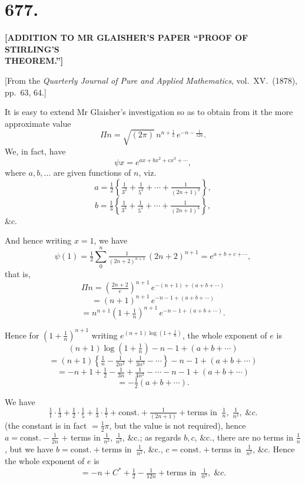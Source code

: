 \documentclass[11pt,a4paper]{article}
\begin{document}
\section*{677.}

\begin{center}
\textbf{[ADDITION TO MR GLAISHER'S PAPER ``PROOF OF STIRLING'S\\
THEOREM.'']}
\end{center}

\medskip

\begin{center}
[From the \emph{Quarterly Journal of Pure and Applied Mathematics}, vol.~XV.\ (1878), pp.~63, 64.]
\end{center}

\medskip

\noindent It is easy to extend Mr Glaisher's investigation so as to obtain from it the more approximate value
\[
\Pi n = \sqrt{(2\pi)}\,n^{n + \frac{1}{2}}\,e^{-n - \frac{1}{12n}}.
\]
We, in fact, have
\[
\psi x = e^{ax + bx^{2} + cx^{3} + \cdots},
\]
where $a, b, \ldots$ are given functions of $n$, viz.
\[
a = \tfrac{1}{2}\left\{\tfrac{1}{3^{2}} + \tfrac{1}{5^{2}} + \cdots + \tfrac{1}{(2n + 1)^{2}}\right\},
\]
\[
b = \tfrac{1}{3}\left\{\tfrac{1}{3^{3}} + \tfrac{1}{5^{3}} + \cdots + \tfrac{1}{(2n + 1)^{3}}\right\},
\]
\&c.

And hence writing $x = 1$, we have
\[
\psi(1) = \tfrac{1}{2}\sum_{0}^{n} \tfrac{1}{(2n + 2)^{n + 1}}\,(2n + 2)^{n + 1} = e^{a + b + c + \cdots},
\]
that is,
\[
\Pi n = \left(\tfrac{2n + 2}{e}\right)^{n + 1}\,e^{-(n + 1) + (a + b + \cdots)}
\]
\[
= (n + 1)^{n + 1}\,e^{-n - 1 + (a + b + \cdots)}
\]
\[
= n^{n + 1}\left(1 + \tfrac{1}{n}\right)^{n + 1}\,e^{-n - 1 + (a + b + \cdots)}.
\]

\newpage


\noindent Hence for $\left(1 + \tfrac{1}{n}\right)^{n + 1}$ writing $e^{(n + 1)\log\left(1 + \frac{1}{n}\right)}$, the whole exponent of $e$ is
\[
(n + 1)\log\left(1 + \tfrac{1}{n}\right) - n - 1 + (a + b + \cdots)
\]
\[
= (n + 1)\left\{\tfrac{1}{n} - \tfrac{1}{2 n^{2}} + \tfrac{1}{3 n^{3}} - \cdots\right\} - n - 1 + (a + b + \cdots)
\]
\[
= -n + 1 + \tfrac{1}{2} - \tfrac{1}{3n} + \tfrac{1}{4n^{2}} - \cdots - n - 1 + (a + b + \cdots)
\]
\[
= -\tfrac{1}{2}(a + b + \cdots).
\]

We have
\[
\tfrac{1}{1}\cdot \tfrac{1}{3} + \tfrac{1}{2}\cdot \tfrac{1}{5} + \tfrac{1}{3}\cdot \tfrac{1}{7} + \text{const.} + \tfrac{1}{(2n + 1)} + \text{terms in}\;\;\tfrac{1}{n},\;\tfrac{1}{n^{2}},\;\&c.
\]
(the constant is in fact $= \tfrac{1}{2}\pi$, but the value is not required), hence $a = \text{const.} - \tfrac{1}{2n}$ + terms in $\tfrac{1}{n^{2}}$, $\tfrac{1}{n^{3}}$, \&c.; as regards $b, c$, \&c., there are no terms in $\tfrac{1}{n}$, but we have $b = \text{const.} + \text{terms in}\;\;\tfrac{1}{n^{2}}$, \&c., $c = \text{const.} + \text{terms in}\;\;\tfrac{1}{n^{2}}$, \&c. Hence the whole exponent of $e$ is
\[
= -n + C^{*} + \tfrac{1}{2} - \tfrac{1}{12n} + \text{terms in}\;\;\tfrac{1}{n^{2}},\;\&c.
\]
\end{document}
